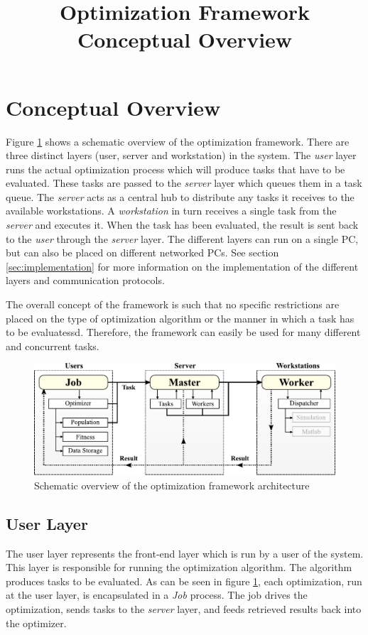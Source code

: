 \documentclass{article}
\title{Optimization Framework Conceptual Overview}
\begin{document}
\maketitle

\section{Conceptual Overview}
Figure \ref{fig:overview} shows a schematic overview of the optimization
framework. There are three distinct layers (user, server and workstation)
in the system. The \textit{user} layer runs the actual optimization process
which will produce tasks that have to be evaluated. These tasks are passed
to the \textit{server} layer which queues them in a task queue. The 
\textit{server} acts as a central hub to distribute any tasks it receives
to the available workstations. A \textit{workstation} in turn receives a 
single task from the \textit{server} and executes it. When the task has been
evaluated, the result is sent back to the \textit{user} through the
\textit{server} layer. The different layers can run on a single PC, but can 
also be placed on different networked PCs. See section \ref{sec:implementation}
for more information on the implementation of the different layers and
communication protocols.

The overall concept of the framework is such that no specific
restrictions are placed on the type of optimization algorithm or the manner
in which a task has to be evaluatessd. Therefore, the framework can easily be
used for many different and concurrent tasks.

\begin{figure}[h!tb]
	\centering
	\includegraphics[width=\textwidth]{images/overview}
	\caption{Schematic overview of the optimization framework architecture}
	\label{fig:overview}
\end{figure}

\subsection{User Layer}
The user layer represents the front-end layer which is run by a user of the
system. This layer is responsible for running the optimization algorithm. The
algorithm produces tasks to be evaluated. As can be seen in figure
\ref{fig:overview}, each optimization, run at the user layer, is encapsulated
in a \textit{Job} process. The job drives the optimization, sends tasks
to the \textit{server} layer, and feeds retrieved results back into the 
optimizer.
\end{document}
